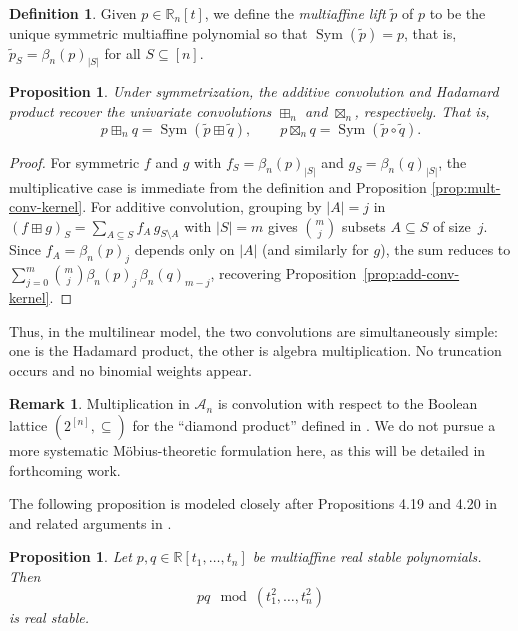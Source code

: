\documentclass[11pt]{amsart}
\newtheorem{prop}[thm]{Proposition}
\theoremstyle{definition}
\newtheorem{defn}[thm]{Definition}
\newtheorem{remark}[thm]{Remark}
\DeclareMathOperator{\Sym}{Sym}
\begin{document}
\begin{defn}\label{defn:multiaffine-lift}
    Given $p\in\mathbb R_n[t]$, we define the \emph{multiaffine lift} $\widetilde p$ of $p$ to be the unique symmetric multiaffine polynomial so that $\Sym(\widetilde p) = p$, that is, $\widetilde p_S = \beta_{n}(p)_{|S|}$ for all $S\subseteq [n]$.
\end{defn}

\begin{prop}\label{prop:sym-recovery}
Under symmetrization, the additive convolution and Hadamard product recover the univariate convolutions $\boxplus_n$ and $\boxtimes_n$, respectively. That is, 
\[
p\boxplus_n q = \Sym(\widetilde p \boxplus \widetilde q), \qquad p\boxtimes_n q = \Sym(\widetilde p \circ \widetilde q).
\]
\end{prop}

\begin{proof}
For symmetric $f$ and $g$ with
$f_S = \beta_n(p)_{|S|}$ and $g_S = \beta_n(q)_{|S|}$,
the multiplicative case is immediate from the definition and Proposition \ref{prop:mult-conv-kernel}.
For additive convolution, grouping by $|A|=j$ in $(f\boxplus g)_S = \sum_{A\subseteq S}f_A\,g_{S\setminus A}$ with $|S|=m$ gives $\binom{m}{j}$ subsets $A\subseteq S$ of size~$j$.  Since $f_A = \beta_n(p)_j$ depends only on $|A|$ (and similarly for $g$), the sum reduces to $\sum_{j=0}^m \binom{m}{j}\beta_n(p)_j\,\beta_n(q)_{m-j}$, recovering Proposition~\ref{prop:add-conv-kernel}.
\end{proof}

Thus, in the multilinear model, the two convolutions are
simultaneously simple: one is the Hadamard product, the other
is algebra multiplication.  No truncation occurs and no
binomial weights appear.

\begin{remark}
Multiplication in $\mathcal{A}_n$ is convolution with
respect to the Boolean lattice $(2^{[n]},\subseteq)$ for the ``diamond product'' defined in \cite{Sin26}. We do
not pursue a more systematic M\"obius-theoretic formulation here, as this will be detailed in forthcoming work.
\end{remark}

\bigskip

The following proposition is modeled closely after Propositions 4.19 and 4.20 in \cite{Choe04} and related arguments in \cite{Hin95}.

\begin{prop}\label{prop:real-stable-squarefree}
Let $p,q\in\mathbb R[t_1,\dots,t_n]$ be multiaffine real stable
polynomials. Then
\[
  pq \mod (t_1^2,\dots,t_n^2)
\]
is real stable.
\end{prop}
\end{document}
